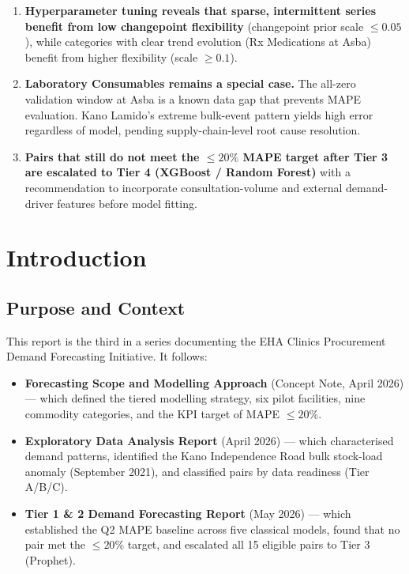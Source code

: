 \documentclass[12pt, a4paper]{article}
\begin{document}
\begin{mdframed}[style=keybox]
\begin{enumerate}[leftmargin=1.5em, itemsep=3pt]
  \item \textbf{Hyperparameter tuning reveals that sparse, intermittent
        series benefit from low changepoint flexibility} (changepoint prior
        scale $\leq 0.05$), while categories with clear trend evolution
        (Rx Medications at Asba) benefit from higher flexibility
        (scale $\geq 0.1$).

  \item \textbf{Laboratory Consumables remains a special case.}
        The all-zero validation window at Asba is a known data gap that
        prevents MAPE evaluation. Kano Lamido's extreme bulk-event
        pattern yields high error regardless of model, pending
        supply-chain-level root cause resolution.

  \item \textbf{Pairs that still do not meet the $\leq 20\%$ MAPE target
        after Tier 3 are escalated to Tier 4 (XGBoost / Random Forest)}
        with a recommendation to incorporate consultation-volume and
        external demand-driver features before model fitting.
\end{enumerate}
\end{mdframed}

\newpage
\tableofcontents
\newpage

\section{Introduction}

\subsection{Purpose and Context}

This report is the third in a series documenting the EHA Clinics
Procurement Demand Forecasting Initiative. It follows:

\begin{itemize}[leftmargin=1.5em, itemsep=3pt]
  \item \textbf{Forecasting Scope and Modelling Approach} (Concept Note,
        April 2026) --- which defined the tiered modelling strategy,
        six pilot facilities, nine commodity categories, and the
        KPI target of MAPE $\leq 20\%$.

  \item \textbf{Exploratory Data Analysis Report} (April 2026) ---
        which characterised demand patterns, identified the Kano
        Independence Road bulk stock-load anomaly (September 2021),
        and classified pairs by data readiness (Tier A/B/C).

  \item \textbf{Tier 1 \& 2 Demand Forecasting Report} (May 2026) ---
        which established the Q2 MAPE baseline across five classical
        models, found that no pair met the $\leq 20\%$ target, and
        escalated all 15 eligible pairs to Tier 3 (Prophet).
\end{itemize}
\end{document}
